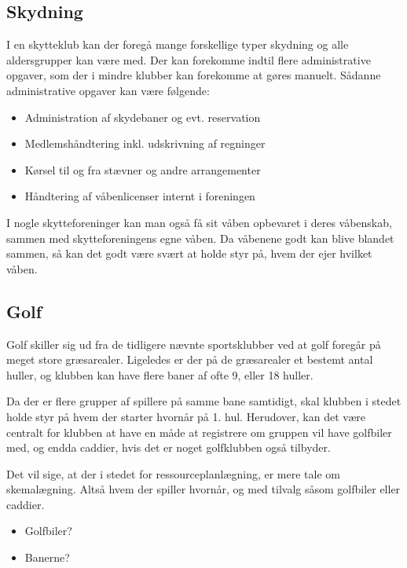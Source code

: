 \subsection{Skydning}
I en skytteklub kan der foregå mange forskellige typer skydning og alle aldersgrupper kan være med. Der kan forekomme indtil flere administrative opgaver, som der i mindre klubber kan forekomme at gøres manuelt. Sådanne administrative opgaver kan være følgende:
\begin{itemize}
\item Administration af skydebaner og evt. reservation
\item Medlemshåndtering inkl. udskrivning af regninger
\item Kørsel til og fra stævner og andre arrangementer
\item Håndtering af våbenlicenser internt i foreningen
\end{itemize}
I nogle skytteforeninger kan man også få sit våben opbevaret i deres våbenskab, sammen med skytteforeningens egne våben. Da våbenene godt kan blive blandet sammen, så kan det godt være svært at holde styr på, hvem der ejer hvilket våben.

\subsection{Golf}
Golf skiller sig ud fra de tidligere nævnte sportsklubber ved at golf foregår på meget store græsarealer. Ligeledes er der på de græsarealer et bestemt antal huller, og klubben kan have flere baner af ofte 9, eller 18 huller. 

Da der er flere grupper af spillere på samme bane samtidigt, skal klubben i stedet holde styr på hvem der starter hvornår på 1. hul. Herudover, kan det være centralt for klubben at have en måde at registrere om gruppen vil have golfbiler med, og endda caddier, hvis det er noget golfklubben også tilbyder.

Det vil sige, at der i stedet for ressourceplanlægning, er mere tale om skemalægning. Altså hvem der spiller hvornår, og med tilvalg såsom golfbiler eller caddier.
\begin{itemize}
\item Golfbiler?
\item Banerne?
\end{itemize}

